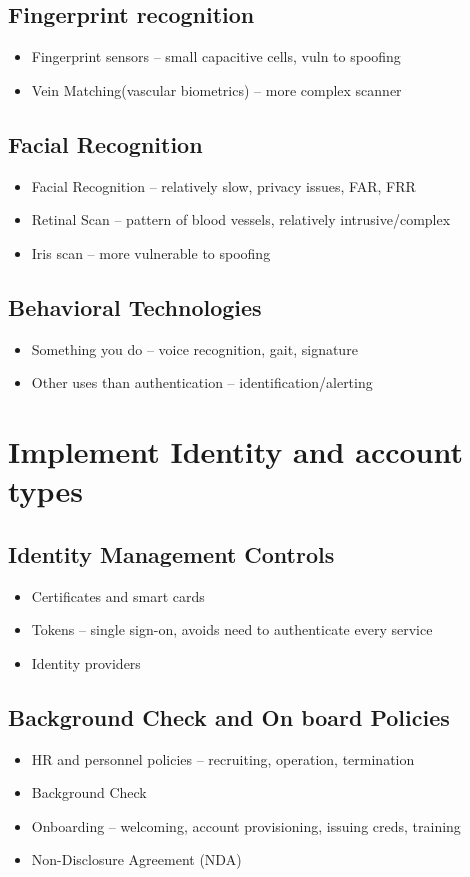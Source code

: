	\subsection {Fingerprint recognition}
		\begin{itemize}
			\item Fingerprint sensors -- small capacitive cells, vuln to spoofing
			\item Vein Matching(vascular biometrics) -- more complex scanner
		\end{itemize}
	\subsection {Facial Recognition}
		\begin{itemize}
			\item Facial Recognition -- relatively slow, privacy issues, FAR, FRR
			\item Retinal Scan -- pattern of blood vessels, relatively intrusive/complex
			\item Iris scan -- more vulnerable to spoofing
		\end{itemize}
	\subsection {Behavioral Technologies}
		\begin{itemize}
			\item Something you do -- voice recognition, gait, signature
			\item Other uses than authentication -- identification/alerting
		\end{itemize}
	
\section {Implement Identity and account types}
	\subsection {Identity Management Controls}
		\begin{itemize}
			\item Certificates and smart cards
			\item Tokens -- single sign-on, avoids need to authenticate every service
			\item Identity providers
		\end{itemize}
	\subsection {Background Check and On board Policies}
		\begin{itemize}
			\item HR and personnel policies -- recruiting, operation, termination
			\item Background Check
			\item Onboarding -- welcoming, account provisioning, issuing creds, training
			\item Non-Disclosure Agreement (NDA)
		\end{itemize}
